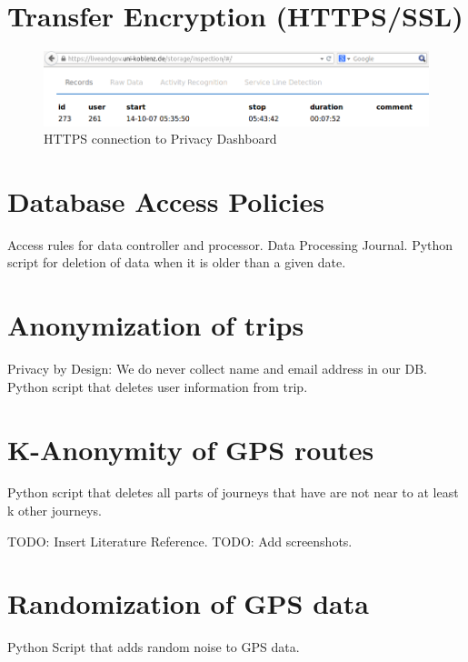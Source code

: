\section{Transfer Encryption (HTTPS/SSL)}
\begin{figure}
\includegraphics[width=\textwidth]{screenshots/HTTPS.png}
\caption{HTTPS connection to Privacy Dashboard}
\end{figure}

\section{Database Access Policies}
Access rules for data controller and processor.
Data Processing Journal.
Python script for deletion of data when it is older than a given date.

\section{Anonymization of trips}
Privacy by Design: We do never collect name and email address in our DB.
Python script that deletes user information from trip.

\section{K-Anonymity of GPS routes}
Python script that deletes all parts of journeys that have are not near to at least k other journeys.

TODO: Insert Literature Reference.
TODO: Add screenshots.

\section{Randomization of GPS data}
Python Script that adds random noise to GPS data.
